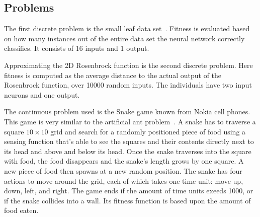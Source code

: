 \subsection{Problems}
The first discrete problem is the small leaf data set~\cite{Bache+Lichman:2013, leafdataset}. Fitness is evaluated based on how many instances out of the entire data set the neural network correctly classifies. It consists of 16 inputs and 1 output.

Approximating the 2D Rosenbrock function is the second discrete problem. Here fitness is computed as the average distance to the actual output of the Rosenbrock function, over \num{10000} random inputs. The individuals have two input neurons and one output.

The continuous problem used is the Snake game known from Nokia cell phones. This game is very similar to the artificial ant problem~\cite[p.\ 147--155]{koza1992genetic}. A snake has to traverse a square $10\times10$ grid and search for a randomly positioned piece of food using a sensing function that's able to see the squares and their contents directly next to its head and above and below its head. Once the snake traverses into the square with food, the food disappears and the snake's length grows by one square. A new piece of food then spawns at a new random position. The snake has four actions to move around the grid, each of which takes one time unit: move up, down, left, and right. The game ends if the amount of time units exeeds \num{1000}, or if the snake collides into a wall. Its fitness function is based upon the amount of food eaten.
